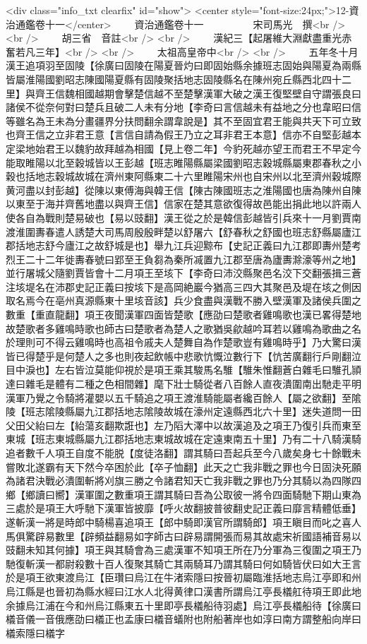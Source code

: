 <div class="info_txt clearfix" id="show">
<center style="font-size:24px;">12-資治通鑑卷十一</center>
  　　資治通鑑卷十一　　　　　宋司馬光　撰<br />
<br />
　　胡三省　音註<br />
<br />
　　漢紀三【起屠維大淵獻盡重光赤奮若凡三年】<br />
<br />
　　太祖高皇帝中<br />
<br />
　　五年冬十月漢王追項羽至固陵【徐廣曰固陵在陽夏晉灼曰即固始縣余據班志固始與陽夏為兩縣皆屬淮陽國劉昭志陳國陽夏縣有固陵聚括地志固陵縣名在陳州宛丘縣西北四十二里】與齊王信魏相國越期會擊楚信越不至楚擊漢軍大破之漢王復堅壁自守謂張良曰諸侯不從奈何對曰楚兵且破二人未有分地【李奇曰言信越未有益地之分也韋昭曰信等雖名為王未為分畫疆界分扶問翻余謂韋說是】其不至固宜君王能與共天下可立致也齊王信之立非君王意【言信自請為假王乃立之耳非君王本意】信亦不自堅彭越本定梁地始君王以魏豹故拜越為相國【見上卷二年】今豹死越亦望王而君王不早定今能取睢陽以北至穀城皆以王彭越【班志睢陽縣屬梁國劉昭志穀城縣屬東郡春秋之小穀也括地志穀城故城在濟州東阿縣東二十六里睢陽宋州也自宋州以北至濟州穀城際黄河盡以封彭越】從陳以東傅海與韓王信【陳古陳國班志之淮陽國也唐為陳州自陳以東至于海并齊舊地盡以與齊王信】信家在楚其意欲復得故邑能出捐此地以許兩人使各自為戰則楚易破也【易以豉翻】漢王從之於是韓信彭越皆引兵來十一月劉賈南渡淮圍夀春遣人誘楚大司馬周殷殷畔楚以舒屠六【舒春秋之舒國也班志舒縣屬廬江郡括地志舒今廬江之故舒城是也】舉九江兵迎黥布【史記正義曰九江郡即夀州楚考烈王二十二年徙夀春號曰郢至王負芻為秦所㓕置九江郡至唐為廬夀滁濠等州之地】並行屠城父隨劉賈皆會十二月項王至垓下【李奇曰沛洨縣聚邑名洨下交翻張揖三蒼注垓堤名在沛郡史記正義曰按垓下是高岡絶巖今猶高三四大其聚邑及堤在垓之側因取名焉今在亳州真源縣東十里垓音該】兵少食盡與漢戰不勝入壁漢軍及諸侯兵圍之數重【重直龍翻】項王夜聞漢軍四面皆楚歌【應劭曰楚歌者雞鳴歌也漢已畧得楚地故楚歌者多雞鳴時歌也師古曰楚歌者為楚人之歌猶吳歈越吟耳若以雞鳴為歌曲之名於理則可不得云雞鳴時也高祖令戚夫人楚舞自為作楚歌豈有雞鳴時乎】乃大驚曰漢皆已得楚乎是何楚人之多也則夜起飲帳中悲歌忼慨泣數行下【忼苦廣翻行戶剛翻泣目中淚也】左右皆泣莫能仰視於是項王乘其駿馬名騅【騅朱惟翻蒼白雜毛曰騅孔頴達曰雜毛是體有二種之色相間雜】麾下壯士騎從者八百餘人直夜潰圍南出馳走平明漢軍乃覺之令騎將灌嬰以五千騎追之項王渡淮騎能屬者纔百餘人【屬之欲翻】至隂陵【班志隂陵縣屬九江郡括地志隂陵故城在濠州定遠縣西北六十里】迷失道問一田父田父紿曰左【紿蕩亥翻欺誑也】左乃䧟大澤中以故漢追及之項王乃復引兵而東至東城【班志東城縣屬九江郡括地志東城故城在定遠東南五十里】乃有二十八騎漢騎追者數千人項王自度不能脱【度徒洛翻】謂其騎曰吾起兵至今八歲矣身七十餘戰未嘗敗北遂霸有天下然今卒困於此【卒子恤翻】此天之亡我非戰之罪也今日固決死願為諸君決戰必潰圍斬將刈旗三勝之令諸君知天亡我非戰之罪也乃分其騎以為四隊四鄉【鄉讀曰嚮】漢軍圍之數重項王謂其騎曰吾為公取彼一將令四面騎馳下期山東為三處於是項王大呼馳下漢軍皆披靡【呼火故翻披普彼翻史記正義曰靡言精體低垂】遂斬漢一將是時郎中騎楊喜追項王【郎中騎即漢官所謂騎郎】項王瞋目而叱之喜人馬俱驚辟易數里【辟頻益翻易如字師古曰辟易謂開張而易其故處宋祈國語補音易以豉翻未知其何據】項王與其騎會為三處漢軍不知項王所在乃分軍為三復圍之項王乃馳復斬漢一都尉殺數十百人復聚其騎亡其兩騎耳乃謂其騎曰何如騎皆伏曰如大王言於是項王欲東渡烏江【臣瓚曰烏江在牛渚索隱曰按晉初屬臨淮括地志烏江亭即和州烏江縣是也晉初為縣水經曰江水人北得黄律口漢書所謂烏江亭長檥舡待項王即此地余據烏江浦在今和州烏江縣東五十里即亭長檥船待羽處】烏江亭長檥船待【徐廣曰檥音儀一音俄應劭曰檥正也孟康曰檥音蟻附也附船著岸也如淳曰南方謂整船向岸曰檥索隱曰檥字